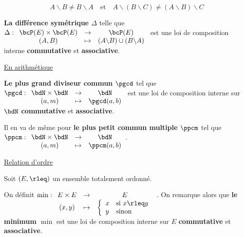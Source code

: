 \documentclass[a4paper,french,bookmarks]{article}
\begin{document}
\begin{enumerate}
\begin{enumerate}
        \[A\backslash B \neq B \backslash A \quad \text{et} \quad A \backslash (B \backslash C) \neq (A \backslash B) \backslash C\]
    
        \itstar \textbf{La différence symétrique $\Delta$} telle que $\Delta : \begin{array}[t]{ccc}
            \bcP(E) \times \bcP(E) &\to& \bcP(E)  \\
            (A, B) &\mapsto& (A\backslash B) \cup (B\backslash A) 
        \end{array}$ est une loi de composition interne \textbf{commutative} et \textbf{associative}.
        
    \end{enumerate}
   
    \ithand \underline{En arithmétique}
    
    \begin{enumerate}
    
        \itstar \textbf{Le plus grand diviseur commun $\pgcd$} tel que $\pgcd : \begin{array}[t]{ccc}
            \bdN\times\bdN &\to& \bdN  \\
            (a, m) &\mapsto& \pgcd(a, b)
        \end{array}$ est une loi de composition interne sur $\bdN$ \textbf{commutative} et \textbf{associative}.
        
        \itstar Il en va de même pour \textbf{le plus petit commun multiple $\ppcm$} tel que $\ppcm : \begin{array}[t]{ccc}
            \bdN\times\bdN &\to& \bdN  \\
            (a, m) &\mapsto& \ppcm(a, b)
        \end{array}$.
        
    \end{enumerate}
    
    \ithand \underline{Relation d'ordre}
    
    Soit $(E, \rleq)$ un ensemble totalement ordonné.
    
    \begin{enumerate}
    
        \itstar  On définit $\min : \begin{array}[t]{ccc}
        E\times E &\to& E  \\
        (x, y) &\mapsto& \left\lbrace\begin{array}{ll}
            x & \text{si} \ x \rleq y   \\
            y & \text{sinon}
        \end{array}\right.
    \end{array}$. On remarque alors que \textbf{le minimum $\min$} est une loi de composition interne sur $E$ \textbf{commutative} et \textbf{associative}.
    

\end{enumerate}
\end{enumerate}
\end{document}
